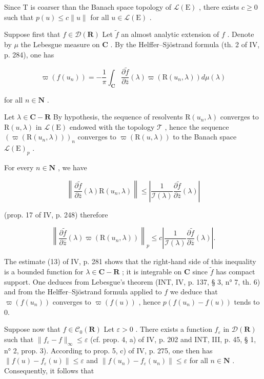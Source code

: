 Since T is coarser than the Banach space topology of \(\mathcal{L}(\mathrm{E})\) , there exists \(c \geqslant 0\) such that \(p(u) \leqslant c \|u\|\) for all \(u \in \mathcal{L}(\mathrm{E})\) .

Suppose first that \(f \in \mathcal{D}(\mathbf{R})\) Let \(\tilde{f}\) an almost analytic extension of \(f\) . Denote by \(\mu\) the Lebesgue measure on \(\mathbf{C}\) . By the Helffer--Sjöstrand formula (th. 2 of IV, p. 284), one has

\[
\varpi (f (u _ {n})) = - \frac {1}{\pi} \int_ {\mathbf {C}} \frac {\partial \widetilde {f}}{\partial \bar {z}} (\lambda) \varpi (\mathrm{R} (u _ {n}, \lambda)) d \mu (\lambda)\tag{14}
\]

for all \(n \in \mathbf{N}\) .

Let \(\lambda \in \mathbf{C} - \mathbf{R}\) By hypothesis, the sequence of resolvents \(\mathrm{R}(u_n,\lambda)\) converges to \(\mathrm{R}(u,\lambda)\) in \(\mathcal{L}(\mathrm{E})\) endowed with the topology \(\mathcal{T}\) , hence the sequence \((\varpi (\mathrm{R}(u_n,\lambda)))_n\) converges to \(\varpi (\mathrm{R}(u,\lambda))\) to the Banach space \(\mathcal{L}(\mathrm{E})_p\) .

For every \(n \in \mathbf{N}\) , we have

\[
\left\| \frac {\partial \widetilde {f}}{\partial \bar {z}} (\lambda) \mathrm{R} (u _ {n}, \lambda) \right\| \leqslant \left| \frac {1}{\mathcal{I} (\lambda)} \frac {\partial \widetilde {f}}{\partial \bar {z}} (\lambda) \right|
\]

(prop. 17 of IV, p. 248) therefore

\[
\left\| \frac {\partial \widetilde {f}}{\partial \overline {{z}}} (\lambda) \varpi (\mathrm{R} (u _ {n}, \lambda)) \right\| _ {p} \leqslant c \left| \frac {1}{\mathcal {I} (\lambda)} \frac {\partial \widetilde {f}}{\partial \overline {{z}}} (\lambda) \right|.
\]

The estimate (13) of IV, p. 281 shows that the right-hand side of this inequality is a bounded function for \(\lambda \in \mathbf{C} - \mathbf{R}\) ; it is integrable on \(\mathbf{C}\) since \(\widetilde{f}\) has compact support. One deduces from Lebesgue's theorem (INT, IV, p. 137, § 3, n° 7, th. 6) and from the Helffer--Sjöstrand formula applied to \(f\) we deduce that \(\varpi(f(u_n))\) converges to \(\varpi(f(u))\) , hence \(p(f(u_n) - f(u))\) tends to 0.

Suppose now that \(f \in \mathcal{C}_0(\mathbf{R})\) Let \(\varepsilon > 0\) . There exists a function \(f_{\varepsilon}\) in \(\mathcal{D}(\mathbf{R})\) such that \(\| f_{\varepsilon} - f \|_{\infty} \leqslant \varepsilon\) (cf. prop. 4, a) of IV, p. 202 and INT, III, p. 45, § 1, n° 2, prop. 3). According to prop. 5, c) of IV, p. 275, one then has \(\| f(u) - f_{\varepsilon}(u) \| \leqslant \varepsilon\) and \(\| f(u_n) - f_{\varepsilon}(u_n) \| \leqslant \varepsilon\) for all \(n \in \mathbf{N}\) . Consequently, it follows that

